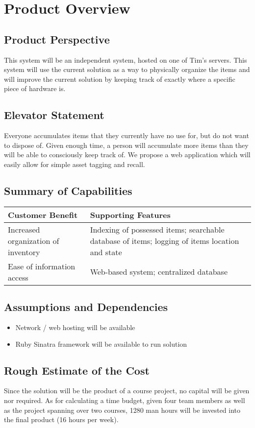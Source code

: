 \documentclass{article}
\begin{document}
\section{Product Overview}

\subsection{Product Perspective}
This system will be an independent system, hosted on one of Tim’s servers.  This system will use the current solution as a way to physically organize the items and will improve the current solution by keeping track of exactly where a specific piece of hardware is.

\subsection{Elevator Statement}
Everyone accumulates items that they currently have no use for, but do not want to dispose of.  Given enough time, a person will accumulate more items than they will be able to consciously keep track of. We propose a web application which will easily allow for simple asset tagging and recall.

\subsection{Summary of Capabilities}
\begin{tabular}{ | p{2.5in} | p{3.5in} | }
\hline
Customer Benefit & Supporting Features\\
\hline
Increased organization of inventory & Indexing of possessed items; searchable database of items; logging of items location and state\\
\hline
Ease of information access & Web-based system; centralized database\\
\hline
\end{tabular}

\subsection{Assumptions and Dependencies}
\begin{itemize}
\item Network / web hosting will be available
\item Ruby Sinatra framework will be available to run solution
\end{itemize}

\subsection{Rough Estimate of the Cost}
Since the solution will be the product of a course project, no capital will be given nor required.  As for calculating a time budget, given four team members as well as the project spanning over two courses, 1280 man hours will be invested into the final product (16 hours per week).
\end{document}
